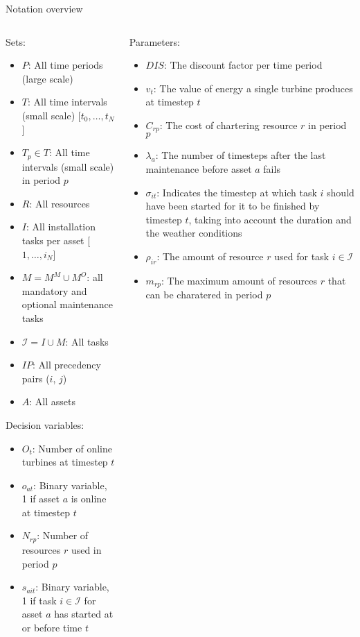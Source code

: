 \documentclass{beamer}
\begin{document}
\begin{frame}{Notation overview}
\tiny

\begin{columns}
\begin{column}{.48\textwidth}
Sets:
\begin{itemize}
\item $P$: All time periods (large scale)
\item $T$: All time intervals (small scale) [$t_0, \dots , t_N$]
\item $T_p \in T$: All time intervals (small scale) in period $p$
\item $R$: All resources
\item $I$: All installation tasks per asset [$1, \dots , i_N$]
\item $M = M^M \cup M^O$: all mandatory and optional maintenance tasks
\item $\mathcal{I} = I \cup M$: All tasks
\item $IP$: All precedency pairs ($i$, $j$)
\item $A$: All assets
\end{itemize}

Decision variables:
\begin{itemize}
\item $O_{t}$: Number of online turbines at timestep $t$
\item $o_{at}$: Binary variable, 1 if asset $a$ is online at timestep $t$
\item $N_{rp}$: Number of resources $r$ used in period $p$
\item $s_{ait}$: Binary variable, 1 if task $i \in \mathcal{I}$ for asset $a$ has started at or before time $t$
\end{itemize}
\end{column}

\hfill

\begin{column}{.48\textwidth}
Parameters:
\begin{itemize}
\item $DIS$: The discount factor per time period
\item $v_t$: The value of energy a single turbine produces at timestep $t$
\item $C_{rp}$: The cost of chartering resource $r$ in period $p$
\item $\lambda_a$: The number of timesteps after the last maintenance before asset $a$ fails
\item $\sigma_{it}$: Indicates the timestep at which task $i$ should have been started for it to be finished by timestep $t$, taking into account the duration and the weather conditions
\item $\rho_{ir}$: The amount of resource $r$ used for task $i \in \mathcal{I}$
\item $m_{rp}$: The maximum amount of resources $r$ that can be charatered in period $p$
\end{itemize}
\end{column}
\end{columns}

\end{frame}
\end{document}
